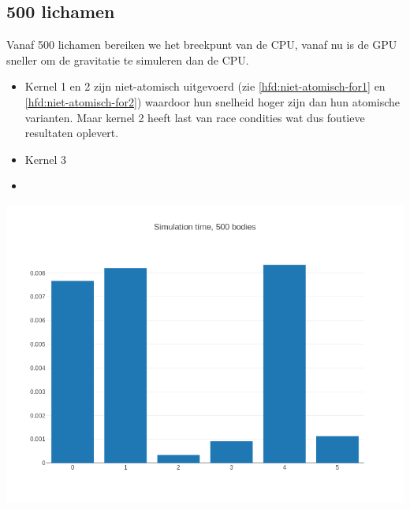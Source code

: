 \documentclass{article}
\begin{document}
\subsection{500 lichamen}
Vanaf 500 lichamen bereiken we het breekpunt van de CPU, vanaf nu is de GPU sneller
om de gravitatie te simuleren dan de CPU.

\begin{itemize}
    \item Kernel 1 en 2 zijn niet-atomisch uitgevoerd (zie \ref{hfd:niet-atomisch-for1} en \ref{hfd:niet-atomisch-for2}) waardoor hun snelheid hoger zijn dan hun atomische varianten.
    Maar kernel 2 heeft last van race condities wat dus foutieve resultaten oplevert.
    \item Kernel 3
    \item
\end{itemize}

\includegraphics[width=\linewidth]{grafiekskes/hist_simulation500.png}
\end{document}
